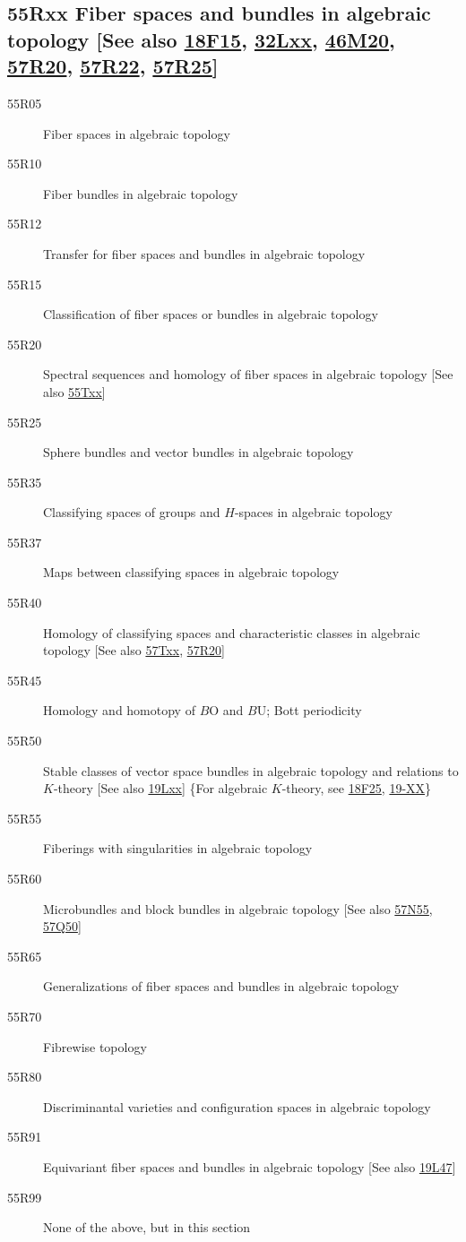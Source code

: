\subsection*{55Rxx  Fiber spaces and bundles in algebraic topology [See also \hyperref[18F15]{18F15}, \hyperref[32Lxx]{32Lxx}, \hyperref[46M20]{46M20}, \hyperref[57R20]{57R20}, \hyperref[57R22]{57R22}, \hyperref[57R25]{57R25}] }\label{55Rxx}
\begin{description}  
\item [55R05]\label{55R05} Fiber spaces in algebraic topology
\item [55R10]\label{55R10} Fiber bundles in algebraic topology
\item [55R12]\label{55R12} Transfer for fiber spaces and bundles in algebraic topology
\item [55R15]\label{55R15} Classification of fiber spaces or bundles in algebraic topology
\item [55R20]\label{55R20} Spectral sequences and homology of fiber spaces in algebraic topology [See also \hyperref[55Txx]{55Txx}]
\item [55R25]\label{55R25} Sphere bundles and vector bundles in algebraic topology
\item [55R35]\label{55R35} Classifying spaces of groups and $H$-spaces in algebraic topology
\item [55R37]\label{55R37} Maps between classifying spaces in algebraic topology
\item [55R40]\label{55R40} Homology of classifying spaces and characteristic classes in algebraic topology [See also \hyperref[57Txx]{57Txx}, \hyperref[57R20]{57R20}]
\item [55R45]\label{55R45} Homology and homotopy of $B\mathrm{O}$ and $B\mathrm{U}$; Bott periodicity
\item [55R50]\label{55R50} Stable classes of vector space bundles in algebraic topology and relations to $K$-theory [See also \hyperref[19Lxx]{19Lxx}] \{For algebraic $K$-theory, see \hyperref[18F25]{18F25}, \hyperref[19-XX]{19-XX}\}
\item [55R55]\label{55R55} Fiberings with singularities in algebraic topology
\item [55R60]\label{55R60} Microbundles and block bundles in algebraic topology [See also \hyperref[57N55]{57N55}, \hyperref[57Q50]{57Q50}]
\item [55R65]\label{55R65} Generalizations of fiber spaces and bundles in algebraic topology
\item [55R70]\label{55R70} Fibrewise topology
\item [55R80]\label{55R80} Discriminantal varieties and configuration spaces in algebraic topology
\item [55R91]\label{55R91} Equivariant fiber spaces and bundles in algebraic topology [See also \hyperref[19L47]{19L47}]
\item [55R99]\label{55R99} None of the above, but in this section
\end{description}
